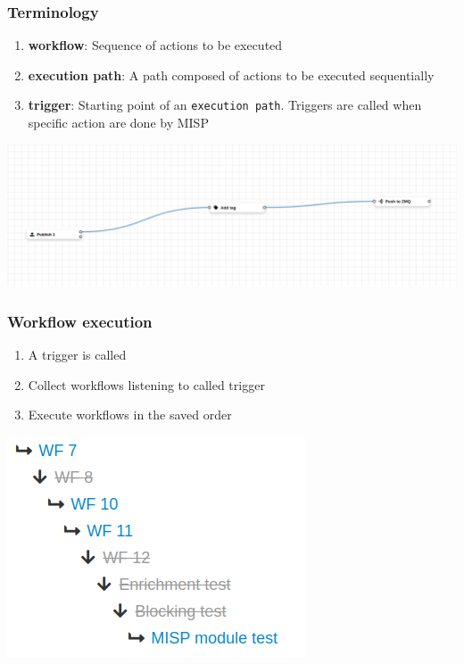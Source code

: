 \begin{frame}
    \frametitle{Terminology}
    \begin{enumerate}
        \item \textbf{workflow}: Sequence of actions to be executed
        \item \textbf{execution path}: A path composed of actions to be executed sequentially
        \item \textbf{trigger}: Starting point of an \texttt{execution path}. Triggers are called when specific action are done by MISP
    \end{enumerate}
    \begin{center}
        \includegraphics[width=1.0\linewidth]{pictures/workflow-view.png}
    \end{center}
\end{frame}

\begin{frame}
    \frametitle{Workflow execution}
    \begin{enumerate}
        \item A trigger is called
        \item Collect workflows listening to called trigger
        \item Execute workflows in the saved order
    \end{enumerate}
    \begin{center}
        \includegraphics[width=0.5\linewidth]{pictures/execution-order-1.png}
    \end{center}
\end{frame}

